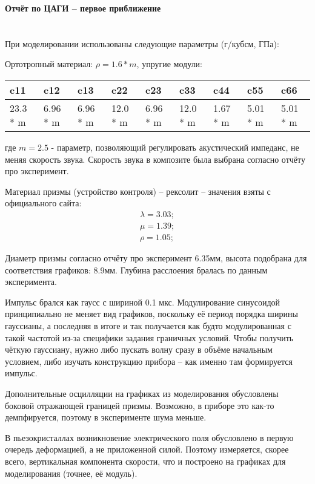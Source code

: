 \documentclass[12pt]{article}
\begin{document}
{\Large \textbf {Отчёт по ЦАГИ -- первое приближение} }

\section{}

При моделировании использованы следующие параметры (г/кубсм, ГПа):

Ортотропный материал: $\rho = 1.6 * m$, упругие модули:

\begin{center}
  \begin{tabular}{| l | l | l | l | l | l | l | l | l |}
    \hline
    c11 & c12 & c13 & c22 & c23 & c33 & c44 & c55 & c66  \\ \hline
    23.3 * m & 6.96 * m & 6.96 * m & 12.0 * m & 6.96 * m & 12.0 * m & 1.67 * m & 5.01 * m & 5.01 * m\\
    \hline
  \end{tabular}
\end{center}

где $ m = 2.5 $ - параметр, позволяющий регулировать акустический импеданс, не меняя скорость звука.
Скорость звука в композите была выбрана согласно отчёту про эксперимент.

Материал призмы (устройство контроля) -- рексолит -- значения взяты с официального сайта:
\begin{eqnarray}
\lambda = 3.03; \\
\mu = 1.39; \\
\rho = 1.05;
\end{eqnarray}

Диаметр призмы согласно отчёту про эксперимент 6.35мм, высота подобрана для соответствия графиков: 8.9мм. Глубина расслоения бралась по данным эксперимента.

Импульс брался как гаусс с шириной 0.1 мкс. Модулирование синусоидой принципиально не меняет вид графиков, поскольку её период порядка ширины гауссианы, а последняя в итоге и так получается как будто модулированная с такой частотой из-за специфики задания граничных условий. Чтобы получить чёткую гауссиану, нужно либо пускать волну сразу в объёме начальным условием, либо изучать конструкцию прибора -- как именно там формируется импульс. 

Дополнительные осцилляции на графиках из моделирования обусловлены боковой отражающей границей  призмы. Возможно, в приборе это как-то демпфируется, поэтому в эксперименте шума меньше.

В пьезокристаллах возникновение электрического поля обусловлено в первую очередь деформацией, а не приложенной силой. Поэтому измеряется, скорее всего, вертикальная компонента скорости, что и построено на графиках для моделирования (точнее, её модуль).
\end{document}
